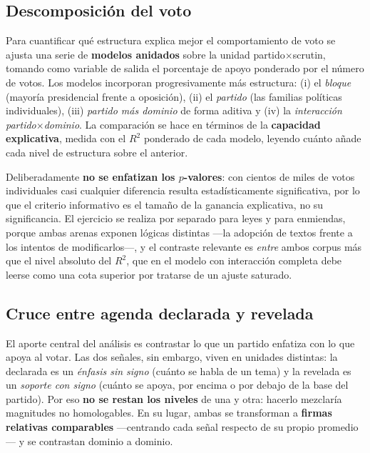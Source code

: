\subsection{Descomposición del voto}
\label{sec:metricas-descomposicion}

Para cuantificar qué estructura explica mejor el comportamiento de voto se ajusta
una serie de \textbf{modelos anidados} sobre la unidad partido$\times$scrutin,
tomando como variable de salida el porcentaje de apoyo ponderado por el número de
votos. Los modelos incorporan progresivamente más estructura: (i) el
\emph{bloque} (mayoría presidencial frente a oposición), (ii) el \emph{partido}
(las familias políticas individuales), (iii) \emph{partido más dominio} de forma
aditiva y (iv) la \emph{interacción partido$\times$dominio}. La comparación se
hace en términos de la \textbf{capacidad explicativa}, medida con el $R^2$
ponderado de cada modelo, leyendo cuánto añade cada nivel de estructura sobre el
anterior.

Deliberadamente \textbf{no se enfatizan los $p$-valores}: con cientos de miles de
votos individuales casi cualquier diferencia resulta estadísticamente
significativa, por lo que el criterio informativo es el tamaño de la ganancia
explicativa, no su significancia. El ejercicio se realiza por separado para leyes
y para enmiendas, porque ambas arenas exponen lógicas distintas ---la adopción de
textos frente a los intentos de modificarlos---, y el contraste relevante es
\emph{entre} ambos corpus más que el nivel absoluto del $R^2$, que en el modelo
con interacción completa debe leerse como una cota superior por tratarse de un
ajuste saturado.

\subsection{Cruce entre agenda declarada y revelada}
\label{sec:metricas-cruce}

El aporte central del análisis es contrastar lo que un partido enfatiza con lo
que apoya al votar. Las dos señales, sin embargo, viven en unidades distintas: la
declarada es un \emph{énfasis sin signo} (cuánto se habla de un tema) y la
revelada es un \emph{soporte con signo} (cuánto se apoya, por encima o por debajo
de la base del partido). Por eso \textbf{no se restan los niveles} de una y otra:
hacerlo mezclaría magnitudes no homologables. En su lugar, ambas se transforman a
\textbf{firmas relativas comparables} ---centrando cada señal respecto de su
propio promedio--- y se contrastan dominio a dominio.

